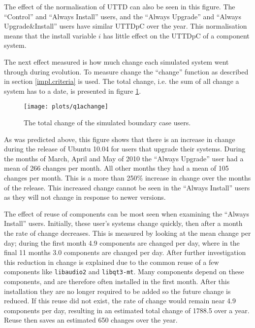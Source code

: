 The effect of the normalisation of UTTD can also be seen in this figure.
The ``Control'' and ``Always Install'' users, and the ``Always Upgrade'' and ``Always Upgrade\&Install'' users have similar UTTDpC over the year.
This normalisation means that the install variable $i$ has little effect on the UTTDpC of a component system.


The next effect measured is how much change each simulated system went through during evolution.
To measure change the ``change'' function as described in section \ref{impl.criteria} is used.
The total change, i.e. the sum of all change a system has to a date, is presented in figure \ref{exp.q1achange}.
\begin{figure}[htp]
\begin{center}
  \texttt{[image: plots/q1achange]}
  \caption{The total change of the simulated boundary case users.}
  \label{exp.q1achange}
\end{center}
\end{figure}

As was predicted above, this figure shows that there is an increase in change during the release of Ubuntu 10.04 for users that upgrade their systems.
During the months of March, April and May of 2010 the ``Always Upgrade'' user had a mean of 266 changes per month.
All other months they had a mean of 105 changes per month.
This is a more than 250\% increase in change over the months of the release.
This increased change cannot be seen in the ``Always Install'' users as they will not change in response to newer versions.

The effect of reuse of components can be most seen when examining the ``Always Install'' users.
Initially, these user's systems change quickly, then after a month the rate of change decreases.
This is measured by looking at the mean change per day; during the first month 4.9 components are changed per day, where in the final 11 months 3.0 components are changed per day.
After further investigation this reduction in change is explained due to the common reuse of a few components like \texttt{libaudio2} and \texttt{libqt3-mt}.
Many components depend on these components, and are therefore often installed in the first month.
After this installation they are no longer required to be added so the future change is reduced.
If this reuse did not exist, the rate of change would remain near 4.9 components per day, resulting in an estimated total change of 1788.5 over a year.
Reuse then saves an estimated 650 changes over the year.


